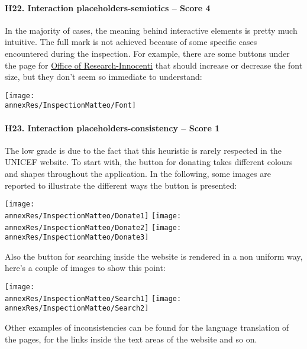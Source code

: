 \paragraph*{H22. Interaction placeholders-semiotics  – Score 4}
In the majority of cases, the meaning behind interactive elements is pretty much intuitive. The full mark is not achieved because of some specific cases encountered during the inspection. 
For example, there are some buttons under the page for \href{https://www.unicef-irc.org/}{Office of Research-Innocenti} that should increase or decrease the font size, but they don't seem so immediate to understand:
\begin{center}
	\texttt{[image: \\annexRes/InspectionMatteo/Font]}
\end{center}


\paragraph*{H23. Interaction placeholders-consistency – Score 1}
The low grade is due to the fact that this heuristic is rarely respected in the UNICEF website. To start with, the button for donating takes different colours and shapes throughout the application. 
In the following, some images are reported to illustrate the different ways the button is presented:

\begin{center}
	\texttt{[image: \\annexRes/InspectionMatteo/Donate1]}
	\hspace{2cm}
	\texttt{[image: \\annexRes/InspectionMatteo/Donate2]}
	\hspace{2cm}
	\texttt{[image: \\annexRes/InspectionMatteo/Donate3]}
\end{center}

Also the button for searching inside the website is rendered in a non uniform way, here's a couple of images to show this point:

\begin{center}
	\texttt{[image: \\annexRes/InspectionMatteo/Search1]} \hspace{5cm}
	\texttt{[image: \\annexRes/InspectionMatteo/Search2]}
\end{center}

Other examples of inconsistencies can be found for the language translation of the pages, for the links inside the text areas of the website and so on.


